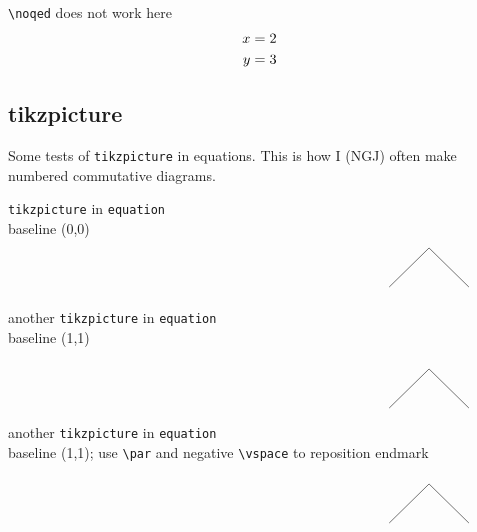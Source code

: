 \documentclass[leqno]{article}
\begin{document}
\begin{test} 
  \verb|\noqed| does not work here
  \begin{align}
    x & = 2\\
    y & = 3\noqed
  \end{align}
\end{test}

\subsection{tikzpicture}

Some tests of \texttt{tikzpicture} in equations.
This is how I (NGJ) often make numbered commutative diagrams.


\begin{test}
  \texttt{tikzpicture} in \texttt{equation}\\
  baseline (0,0)
  \begin{equation}
    \hspace*{.7\textwidth}
    \begin{tikzpicture}
      \draw (0,0) -- ++(1,1) -- ++(1,-1);
    \end{tikzpicture}
  \end{equation}
\end{test}
\begin{test}
  another \texttt{tikzpicture} in \texttt{equation}\\
  baseline (1,1)
  \begin{equation}
    \hspace*{.7\textwidth}
    \begin{tikzpicture}[baseline={(1,1)}]
      \draw (0,0) -- ++(1,1) -- ++(1,-1);
    \end{tikzpicture}
  \end{equation}
\end{test}
\begin{test}
  another \texttt{tikzpicture} in \texttt{equation}\\
  baseline (1,1); use \verb|\par| and negative \verb|\vspace| to reposition endmark
  \begin{equation}
    \hspace*{.7\textwidth}
    \begin{tikzpicture}[baseline={(1,1)}]
      \draw (0,0) -- ++(1,1) -- ++(1,-1);
    \end{tikzpicture}
  \end{equation}\qedprev[1.3]
\end{test}
\end{document}
